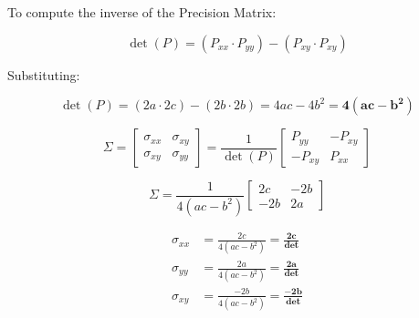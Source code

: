 \documentclass[twoside]{article}
\begin{document}
To compute the inverse of the Precision Matrix:

\[
\det(P) = (P_{xx} \cdot P_{yy}) - (P_{xy} \cdot P_{xy})
\]

Substituting:

\[
\det(P) = (2a \cdot 2c) - (2b \cdot 2b) = 4ac - 4b^2 = \mathbf{4(ac - b^2)}
\]



\[
\Sigma = \begin{bmatrix} \sigma_{xx} & \sigma_{xy} \\ \sigma_{xy} & \sigma_{yy} \end{bmatrix} = \frac{1}{\det(P)} \begin{bmatrix} P_{yy} & -P_{xy} \\ -P_{xy} & P_{xx} \end{bmatrix}
\]



\[
\Sigma = \frac{1}{4(ac - b^2)} \begin{bmatrix} 2c & -2b \\ -2b & 2a \end{bmatrix}
\]



\begin{align*}
\sigma_{xx} &= \frac{2c}{4(ac - b^2)} = \mathbf{\frac{2c}{\text{det}}} \\[1ex]
\sigma_{yy} &= \frac{2a}{4(ac - b^2)} = \mathbf{\frac{2a}{\text{det}}} \\[1ex]
\sigma_{xy} &= \frac{-2b}{4(ac - b^2)} = \mathbf{\frac{-2b}{\text{det}}}
\end{align*}







\newpage
\section*{}



\end{document}
